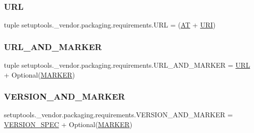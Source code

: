 \subsubsection{\texorpdfstring{U\+RL}{URL}}
{\footnotesize\ttfamily tuple setuptools.\+\_\+vendor.\+packaging.\+requirements.\+U\+RL = (\hyperlink{namespacesetuptools_1_1__vendor_1_1packaging_1_1requirements_a4d75318700123aaa4f1c8dd9516aad55}{AT} + \hyperlink{namespacesetuptools_1_1__vendor_1_1packaging_1_1requirements_a868f8828ab3a7e5820f54373a564aee6}{U\+RI})}

\mbox{\label{namespacesetuptools_1_1__vendor_1_1packaging_1_1requirements_aeb7605debfdb9bb3c3b29df089141b97}} 
\subsubsection{\texorpdfstring{U\+R\+L\+\_\+\+A\+N\+D\+\_\+\+M\+A\+R\+K\+ER}{URL\_AND\_MARKER}}
{\footnotesize\ttfamily tuple setuptools.\+\_\+vendor.\+packaging.\+requirements.\+U\+R\+L\+\_\+\+A\+N\+D\+\_\+\+M\+A\+R\+K\+ER = \hyperlink{namespacesetuptools_1_1__vendor_1_1packaging_1_1requirements_a5e20de54a9b111e067b1aaae33847ff0}{U\+RL} + Optional(\hyperlink{namespacesetuptools_1_1__vendor_1_1packaging_1_1requirements_a8720aaa659500c31754a1fad01b838b6}{M\+A\+R\+K\+ER})}

\mbox{\label{namespacesetuptools_1_1__vendor_1_1packaging_1_1requirements_a0303c649e539a54d4ddae9813689342e}} 
\subsubsection{\texorpdfstring{V\+E\+R\+S\+I\+O\+N\+\_\+\+A\+N\+D\+\_\+\+M\+A\+R\+K\+ER}{VERSION\_AND\_MARKER}}
{\footnotesize\ttfamily setuptools.\+\_\+vendor.\+packaging.\+requirements.\+V\+E\+R\+S\+I\+O\+N\+\_\+\+A\+N\+D\+\_\+\+M\+A\+R\+K\+ER = \hyperlink{namespacesetuptools_1_1__vendor_1_1packaging_1_1requirements_ac834744e2dbb435b5cb01d5d818bf143}{V\+E\+R\+S\+I\+O\+N\+\_\+\+S\+P\+EC} + Optional(\hyperlink{namespacesetuptools_1_1__vendor_1_1packaging_1_1requirements_a8720aaa659500c31754a1fad01b838b6}{M\+A\+R\+K\+ER})}

